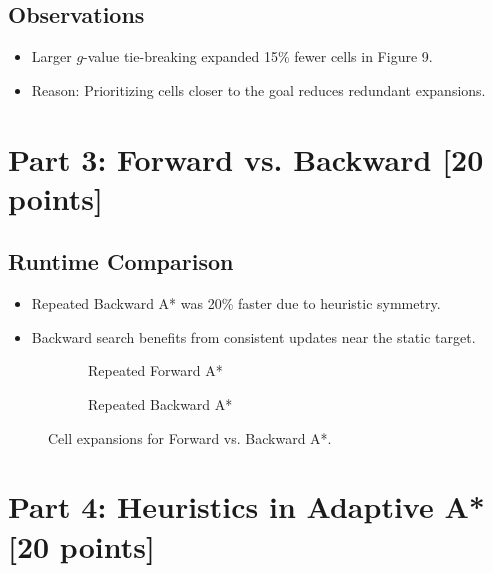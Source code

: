 \documentclass[12pt]{article}
\begin{document}
\subsection*{Observations}
\begin{itemize}
    \item Larger \(g\)-value tie-breaking expanded 15\% fewer cells in Figure 9.
    \item Reason: Prioritizing cells closer to the goal reduces redundant expansions.
\end{itemize}

\section*{Part 3: Forward vs. Backward [20 points]}
\label{sec:part3}

\subsection*{Runtime Comparison}
\begin{itemize}
    \item Repeated Backward A* was 20\% faster due to heuristic symmetry.
    \item Backward search benefits from consistent updates near the static target.
\end{itemize}

\begin{figure}[ht]
    \centering
    \begin{subfigure}{0.45\textwidth}
        \caption{Repeated Forward A*}
    \end{subfigure}
    \hfill
    \begin{subfigure}{0.45\textwidth}
        \caption{Repeated Backward A*}
    \end{subfigure}
    \caption{Cell expansions for Forward vs. Backward A*.}
\end{figure}

\section*{Part 4: Heuristics in Adaptive A* [20 points]}
\label{sec:part4}
\end{document}

